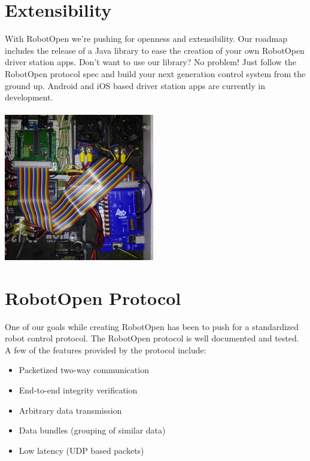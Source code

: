 \documentclass{article}
\begin{document}
\begin{multicols}{2}
\section*{Extensibility}
With RobotOpen we're pushing for openness and extensibility. Our roadmap includes the release of a Java library to ease the creation of your own RobotOpen driver station apps. Don't want to use our library? No problem! Just follow the RobotOpen protocol spec and build your next generation control system from the ground up. Android and iOS based driver station apps are currently in development.
\\\\
\includegraphics[width=248px]{robot.jpg}

\section*{RobotOpen Protocol}
One of our goals while creating RobotOpen has been to push for a standardized robot control protocol. The RobotOpen protocol is well documented and tested. A few of the features provided by the protocol include:
\begin{itemize}

\item Packetized two-way communication
\item End-to-end integrity verification
\item Arbitrary data transmission
\item Data bundles (grouping of similar data)
\item Low latency (UDP based packets)

\end{itemize}

\end{multicols}
\end{document}
